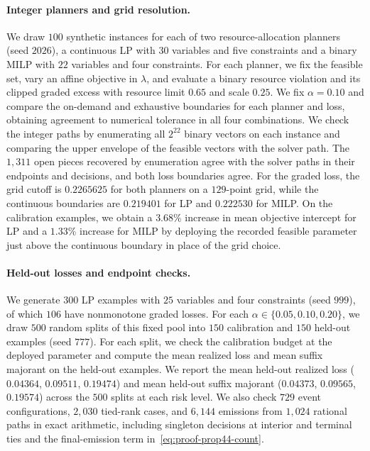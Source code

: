 \documentclass[a4paper,10pt]{article}
\theoremstyle{plain}
\theoremstyle{remark}
\begin{document}
\paragraph{Integer planners and grid resolution.} We draw $100$ synthetic instances for each of two resource-allocation planners (seed $2026$), a continuous LP with $30$ variables and five constraints and a binary MILP with $22$ variables and four constraints. For each planner, we fix the feasible set, vary an affine objective in $\lambda$, and evaluate a binary resource violation and its clipped graded excess with resource limit $0.65$ and scale $0.25$. We fix $\alpha=0.10$ and compare the on-demand and exhaustive boundaries for each planner and loss, obtaining agreement to numerical tolerance in all four combinations. We check the integer paths by enumerating all $2^{22}$ binary vectors on each instance and comparing the upper envelope of the feasible vectors with the solver path. The $1{,}311$ open pieces recovered by enumeration agree with the solver paths in their endpoints and decisions, and both loss boundaries agree. For the graded loss, the grid cutoff is $0.2265625$ for both planners on a $129$-point grid, while the continuous boundaries are $0.219401$ for LP and $0.222530$ for MILP. On the calibration examples, we obtain a $3.68\%$ increase in mean objective intercept for LP and a $1.33\%$ increase for MILP by deploying the recorded feasible parameter just above the continuous boundary in place of the grid choice.

\paragraph{Held-out losses and endpoint checks.} We generate $300$ LP examples with $25$ variables and four constraints (seed $999$), of which $106$ have nonmonotone graded losses. For each $\alpha\in\{0.05,0.10,0.20\}$, we draw $500$ random splits of this fixed pool into $150$ calibration and $150$ held-out examples (seed $777$). For each split, we check the calibration budget at the deployed parameter and compute the mean realized loss and mean suffix majorant on the held-out examples. We report the mean held-out realized loss ($0.04364$, $0.09511$, $0.19474$) and mean held-out suffix majorant ($0.04373$, $0.09565$, $0.19574$) across the $500$ splits at each risk level. We also check $729$ event configurations, $2{,}030$ tied-rank cases, and $6{,}144$ emissions from $1{,}024$ rational paths in exact arithmetic, including singleton decisions at interior and terminal ties and the final-emission term in~\eqref{eq:proof-prop44-count}.
\end{document}
